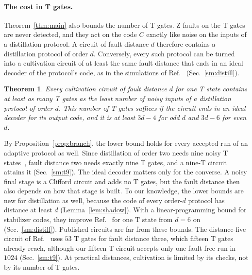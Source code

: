 \documentclass[aps,prl,reprint,twocolumn,amsmath,amssymb,floatfix,nofootinbib,superscriptaddress]{revtex4-2}
\newtheorem{theorem}{Theorem}
\theoremstyle{definition}
\theoremstyle{remark}
\begin{document}
\paragraph*{The cost in T gates.}
Theorem~\ref{thm:main} also bounds the number of T gates. Z faults on the T gates are never detected, and they act on the code $C$ exactly like noise on the inputs of a distillation protocol. A circuit of fault distance $d$ therefore contains a distillation protocol of order $d$. Conversely, every such protocol can be turned into a cultivation circuit of at least the same fault distance that ends in an ideal decoder of the protocol's code, as in the simulations of Ref.~\cite{cultivation} (Sec.~\ref{sm:distill}).
\begin{theorem}\label{cor:exact}
Every cultivation circuit of fault distance $d$ for one T state contains at least as many T gates as the least number of noisy inputs of a distillation protocol of order $d$. This number of T gates suffices if the circuit ends in an ideal decoder for its output code, and it is at least $3d-4$ for odd $d$ and $3d-6$ for even $d$.
\end{theorem}
By Proposition~\ref{prop:branch}, the lower bound holds for every accepted run of an adaptive protocol as well. Since distillation of order two needs nine noisy T states~\cite{distillationpaper}, fault distance two needs exactly nine T gates, and a nine-T circuit attains it (Sec.~\ref{sm:t9}). The ideal decoder matters only for the converse. A noisy final stage is a Clifford circuit and adds no T gates, but the fault distance then also depends on how that stage is built. To our knowledge, the lower bounds are new for distillation as well, because the code of every order-$d$ protocol has distance at least $d$ (Lemma~\ref{lem:shadow}). With a linear-programming bound for stabilizer codes, they improve Ref.~\cite{distillationpaper} for one T state from $d=6$ on (Sec.~\ref{sm:distill}). Published circuits are far from these bounds. The distance-five circuit of Ref.~\cite{cultivation} uses $53$ T gates for fault distance three, which fifteen T gates already reach, although our fifteen-T circuit accepts only one fault-free run in $1024$ (Sec.~\ref{sm:t9}). At practical distances, cultivation is limited by its checks, not by its number of T gates.

%
\end{document}
